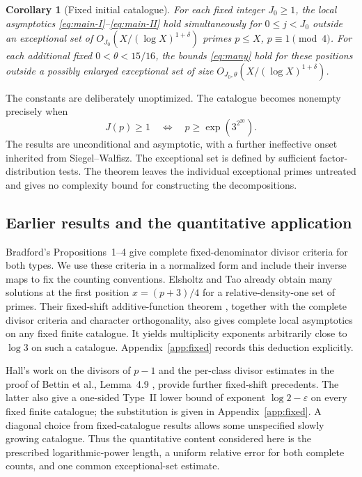 \documentclass[11pt]{article}
\newtheorem{corollary}[theorem]{Corollary}
\theoremstyle{remark}\newtheorem{remark}[theorem]{Remark}
\newcommand{\eps}{\varepsilon}
\begin{document}
\begin{corollary}[Fixed initial catalogue]\label{cor:fixed}
For each fixed integer $J_0\ge1$, the local asymptotics
\eqref{eq:main-I}--\eqref{eq:main-II} hold simultaneously for
$0\le j<J_0$ outside an exceptional set of
$O_{J_0}(X/(\log X)^{1+\delta})$ primes $p\le X$, $p\equiv1\pmod4$.
For each additional fixed $0<\theta<15/16$, the bounds \eqref{eq:many}
hold for these positions outside a possibly enlarged exceptional set
of size $O_{J_0,\theta}(X/(\log X)^{1+\delta})$.
\end{corollary}

The constants are deliberately unoptimized. The catalogue becomes
nonempty precisely when
\begin{equation}\label{eq:nonempty}
 J(p)\ge1\quad\Longleftrightarrow\quad p\ge\exp(3^{2^{20}}).
\end{equation}
The results are unconditional and asymptotic, with a further
ineffective onset inherited from Siegel--Walfisz. The exceptional set
is defined by sufficient factor-distribution tests. The theorem leaves
the individual exceptional primes untreated and gives no complexity
bound for constructing the decompositions.

\subsection{Earlier results and the quantitative application}
Bradford's Propositions~1--4 \cite{Bradford} give complete
fixed-denominator divisor criteria for both types. We use these
criteria in a normalized form and include their inverse maps to fix
the counting conventions. Elsholtz and Tao
\cite[Theorem~1.8 and Section~6]{ET} already obtain many solutions at
the first position $x=(p+3)/4$ for a relative-density-one set of
primes. Their fixed-shift additive-function theorem
\cite[Appendix, Lemma~A.3]{ET}, together with the complete divisor
criteria and character orthogonality, also gives complete local
asymptotics on any fixed finite catalogue. It yields multiplicity
exponents arbitrarily close to $\log3$ on such a catalogue.
Appendix~\ref{app:fixed} records this deduction explicitly.

Hall's work on the divisors of $p-1$ \cite{Hall} and the per-class
divisor estimates in the proof of Bettin et al., Lemma~4.9
\cite{Bettin}, provide further fixed-shift precedents. The latter
also give a one-sided Type~II lower bound of exponent
$\log2-\eps$ on every fixed finite catalogue; the substitution is
given in Appendix~\ref{app:fixed}. A diagonal choice from fixed-catalogue
results allows some unspecified slowly growing catalogue. Thus the
quantitative content considered here is the prescribed logarithmic-power
length, a uniform relative error for both complete counts, and one
common exceptional-set estimate.
\end{document}
